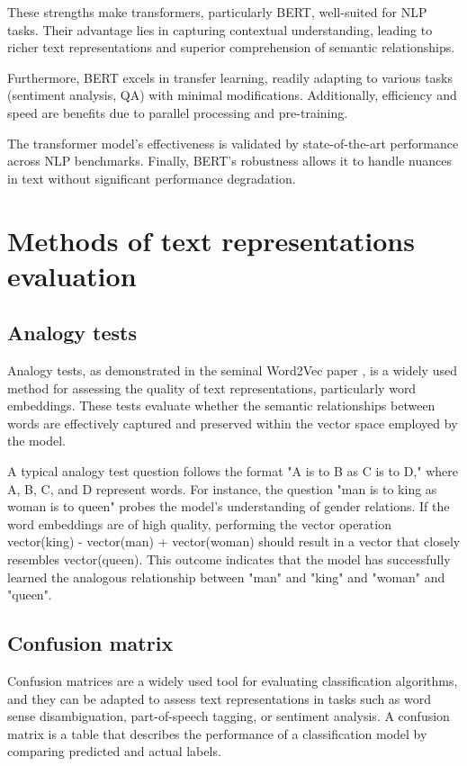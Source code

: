 These strengths make transformers, particularly \ac{BERT}, well-suited for \ac{NLP} tasks.
Their advantage lies in capturing contextual understanding, leading to richer text representations and superior comprehension of semantic relationships.

Furthermore, \ac{BERT} excels in transfer learning, readily adapting to various tasks (sentiment analysis, \ac{QA}) with minimal modifications.
Additionally, efficiency and speed are benefits due to parallel processing and pre-training.

The transformer model's effectiveness is validated by state-of-the-art performance across \ac{NLP} benchmarks.
Finally, \ac{BERT}'s robustness allows it to handle nuances in text without significant performance degradation.

\section{Methods of text representations evaluation}

\subsection{Analogy tests}

Analogy tests, as demonstrated in the seminal Word2Vec paper \cite{mikolov2013efficient}, is a widely used method for assessing the quality of text representations, particularly word embeddings.
These tests evaluate whether the semantic relationships between words are effectively captured and preserved within the vector space employed by the model.

A typical analogy test question follows the format "A is to B as C is to D," where A, B, C, and D represent words.
For instance, the question "man is to king as woman is to queen" probes the model's understanding of gender relations.
If the word embeddings are of high quality, performing the vector operation vector(king) - vector(man) + vector(woman) should result in a vector that closely resembles vector(queen).
This outcome indicates that the model has successfully learned the analogous relationship between "man" and "king" and "woman" and "queen".

\subsection{Confusion matrix}

Confusion matrices are a widely used tool for evaluating classification algorithms, and they can be adapted to assess text representations in tasks such as word sense disambiguation, part-of-speech tagging, or sentiment analysis.
A confusion matrix is a table that describes the performance of a classification model by comparing predicted and actual labels.

